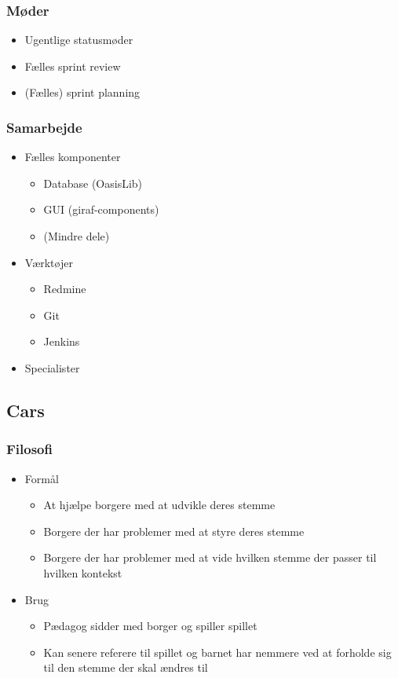 \begin{frame}
\frametitle{Møder}

\begin{itemize}
\item Ugentlige statusmøder
\item Fælles sprint review
\item (Fælles) sprint planning
\end{itemize}

\end{frame}

\begin{frame}
\frametitle{Samarbejde}

\begin{itemize}
\item Fælles komponenter
\begin{itemize}
\item Database (OasisLib)
\item GUI (giraf-components)
\item (Mindre dele)
\end{itemize}
\item Værktøjer
\begin{itemize}
\item Redmine
\item Git
\item Jenkins
\end{itemize}
\item Specialister
\end{itemize}

\end{frame}

\subsection{Cars}

\begin{frame}
\frametitle{Filosofi}

\begin{itemize}
\item Formål
\begin{itemize}
\item At hjælpe borgere med at udvikle deres stemme
\item Borgere der har problemer med at styre deres stemme
\item Borgere der har problemer med at vide hvilken stemme der passer til hvilken kontekst
\end{itemize}
\item Brug
\begin{itemize}
\item Pædagog sidder med borger og spiller spillet
\item Kan senere referere til spillet og barnet har nemmere ved at forholde sig til den stemme der skal ændres til
\end{itemize}
\end{itemize}

\end{frame}

